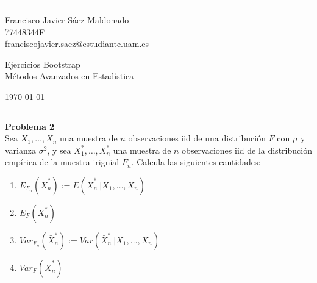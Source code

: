 \documentclass[a4paper]{article}
\newenvironment{problem}[2][Problema]
    { \begin{mdframed}[backgroundcolor=gray!20] \textbf{#1 #2} \\}
    {  \end{mdframed}}
\begin{document}

\fancyhead[C]{}
\hrule \medskip %
\begin{minipage}{0.295\textwidth}
\raggedright
\footnotesize
Francisco Javier Sáez Maldonado \hfill\\
77448344F \hfill\\
franciscojavier.saez@estudiante.uam.es
\end{minipage}
\begin{minipage}{0.4\textwidth}
\centering
\large
Ejercicios Bootstrap\\
\normalsize
Métodos Avanzados en Estadística\\
\end{minipage}
\begin{minipage}{0.295\textwidth}
\raggedleft
\today\hfill\\
\end{minipage}
\medskip\hrule
\bigskip






\begin{problem}{2}
  Sea \( X_1,\dots,X_n\) una muestra de \(n\) observaciones iid de una distribución \(F\) con \(\mu\) y varianza \(\sigma^2\), y sea \(X_1^*,\dots,X_n^*\) una muestra de \(n\) observaciones iid de la distribución empírica de la muestra irignial \(F_n\). Calcula las siguientes cantidades:

  \begin{enumerate}
  \item \(E_{F_n}( \bar X_n^* ):= E(\bar X_n^* \ | X_1,\dots,X_n)\)
  \item \(E_F(\bar{X_n^*})\)
  \item \(Var_{F_n}\left(\bar X_n^*\right) := Var(\bar X_n^* \ | X_1,\dots, X_n)\)
  \item \(Var_F(\bar X_n^*)\)


    \end{enumerate}
  \end{problem}
\end{document}
